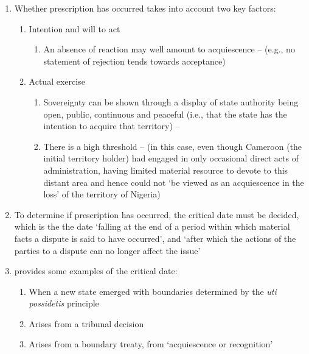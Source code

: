 \begin{enumerate}
\begin{enumerate}
\begin{enumerate}
        \end{enumerate}
        \item Whether prescription has occurred takes into account two key factors:
        \begin{enumerate}
            \item Intention and will to act
            \begin{enumerate}
                \item An absence of reaction may well amount to acquiescence --  (e.g., no statement of rejection tends towards acceptance) 
            \end{enumerate}
            \item Actual exercise
            \begin{enumerate}
                \item Sovereignty can be shown through a display of state authority being open, public, continuous and peaceful (i.e., that the state has the intention to acquire that territory) -- 
                \item There is a high threshold --  (in this case, even though Cameroon (the initial territory holder)  had engaged in only occasional direct acts of administration, having limited material resource to devote to this distant area and hence could not `be viewed as an acquiescence in the loss' of the territory of Nigeria)
            \end{enumerate}
        \end{enumerate}
        \item To determine if prescription has occurred, the critical date must be decided, which is the the date `falling at the end of a period within which material facts a dispute is said to have occurred', and `after which the actions of the parties to a dispute can no longer affect the issue'
        \item {} provides some examples of the critical date:
        \begin{enumerate}
            \item When a new state emerged with boundaries determined by the \textit{uti possidetis} principle
            \item Arises from a tribunal decision
            \item Arises from a boundary treaty, from `acquiescence or recognition'

\end{enumerate}
\end{enumerate}
\end{enumerate}
